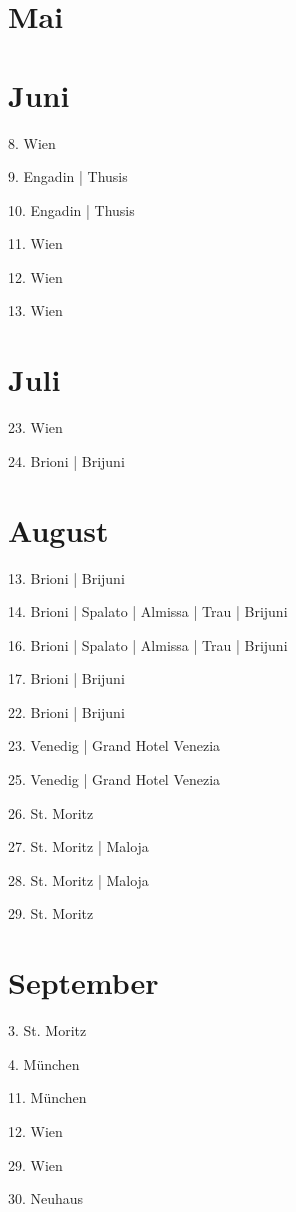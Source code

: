 \documentclass[twoside=false,titlepage=false,open=any, parskip=never, fontsize=10pt, headings=small, chapterprefix=false, appendixprefix=false, DIV=15]{scrbook}
\begin{document}
\begin{multicols}{3}
            \section*{Mai}
            \section*{Juni}
            8. Wien\par
            9. Engadin | Thusis\par
            10. Engadin | Thusis\par
            11. Wien\par
            12. Wien\par
            13. Wien\par
            \section*{Juli}
            23. Wien\par
            24. Brioni | Brijuni\par
            \section*{August}
            13. Brioni | Brijuni\par
            14. Brioni | Spalato | Almissa | Trau | Brijuni\par
            16. Brioni | Spalato | Almissa | Trau | Brijuni\par
            17. Brioni | Brijuni\par
            22. Brioni | Brijuni\par
            23. Venedig | Grand Hotel Venezia\par
            25. Venedig | Grand Hotel Venezia\par
            26. St. Moritz\par
            27. St. Moritz | Maloja\par
            28. St. Moritz | Maloja\par
            29. St. Moritz\par
            \section*{September}
            3. St. Moritz\par
            4. München\par
            11. München\par
            12. Wien\par
            29. Wien\par
            30. Neuhaus\par

\end{multicols}
\end{document}

